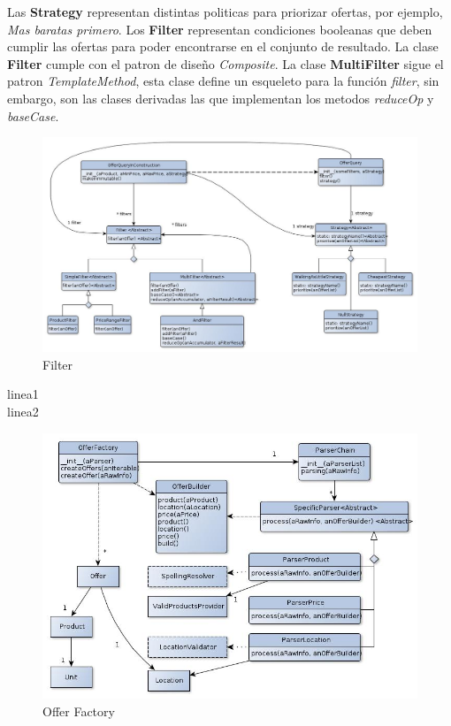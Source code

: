 \documentclass[10pt, a4paper]{article}
\begin{document}
\begin{landscape}
Las \textbf{Strategy} representan distintas politicas para priorizar ofertas, por ejemplo, \emph{Mas baratas primero}.
Los \textbf{Filter} representan condiciones booleanas que deben cumplir las ofertas para poder encontrarse en el conjunto de resultado. La clase \textbf{Filter} cumple con el patron de diseño \emph{Composite}. La clase \textbf{MultiFilter} sigue el patron \emph{TemplateMethod}, esta clase define un esqueleto para la función \emph{filter}, sin embargo, son las clases derivadas las que implementan los metodos \emph{reduceOp} y \emph{baseCase}.

\begin{figure}[H]
\centering
\includegraphics[scale=0.65]{graphics/filter_class.jpg}
\caption{Filter}
\end{figure}

\newpage
linea1\\
linea2\\
\begin{figure}[H]
\centering
\includegraphics[scale=0.65]{graphics/parser_class.jpg}
\caption{Offer Factory}
\end{figure}


\end{landscape}
\end{document}
